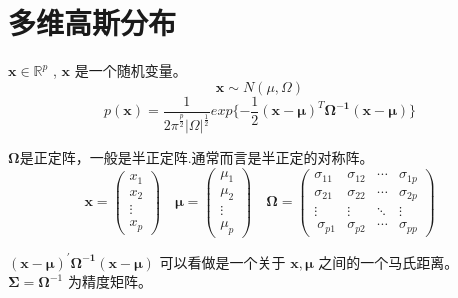 
 \section{多维高斯分布}
 $ \boldsymbol{x} \in \mathbb{R}^{p} $ , $ \boldsymbol{x} $ 是一个随机变量。
\[  \boldsymbol{x} \sim N(\mu,\Omega) \]
\[ p(\boldsymbol{x})= \frac{1}{{2 \pi}^{\frac{p}{2}} \left| \Omega \right|^{\frac{1}{2}}  } 
        exp\{  -\frac{1}{2} {\left( \boldsymbol{x - \mu}  \right)}^{T} \boldsymbol{\Omega^{-1}} \left( \boldsymbol{x - \mu}  \right)\} \]  
        
 $\boldsymbol{\Omega} $是正定阵，一般是半正定阵.通常而言是半正定的对称阵。
\[       \boldsymbol{x} =  \begin{pmatrix}
            x_1 \\
            x_2 \\
            \vdots\\
            x_p
        \end{pmatrix} \quad 
        \boldsymbol{\mu } =  \begin{pmatrix}
            \mu_1 \\
            \mu_2 \\
            \vdots\\
            \mu_p
        \end{pmatrix} \quad
        \boldsymbol{\Omega} =   \begin{pmatrix}
            \sigma_{11} & \sigma_{12} & \cdots & \sigma_{1p} \\
            \sigma_{21} & \sigma_{22} & \cdots & \sigma_{2p}\\
            \vdots&\vdots&  \ddots &\vdots \\\
            \sigma_{p1} & \sigma_{p2} & \cdots & \sigma_{pp}
           \end{pmatrix} \] 

  $  {\left( \boldsymbol{x - \mu}  \right)}^{\prime} \boldsymbol{\Omega^{-1}} \left( \boldsymbol{x - \mu}  \right) $  可以看做是一个关于
  $ \boldsymbol{x} , \boldsymbol{\mu}$ 之间的一个马氏距离。 $ \boldsymbol{\Sigma} = \boldsymbol{\Omega}^{-1} $ 为精度矩阵。

